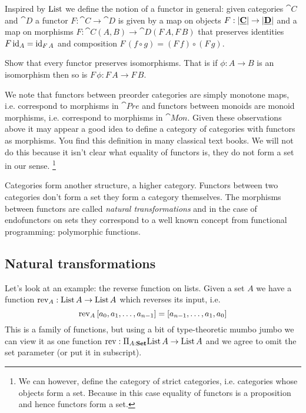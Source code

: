 Inspired by $\mathrm{List}$ we define the notion of a functor in general: given categories $\cat{C}$ and $\cat{D}$ a functor $F : \cat{C} \to \cat{D}$ is given by a map on objects $F : |\underline{\mathbf{C}}| \to |\underline{\mathbf{D}}|$ and a map on morphisms 
$F : \cat{C}(A,B) \to \cat{D}(F\,A,F\,B)$ that preserves identities $F\,\mathrm{id}_A = \mathrm{id}_{F\,A}$ and composition $F\,(f \circ g) = (F\,f) \circ (F\,g)$.

\begin{Exercise}
  Show that every functor preserves isomorphisms. That is if $\phi : A \to B$ is an isomorphism then so is $F\,\phi : F\,A \to F\,B$.
\end{Exercise}

We note that functors between preorder categories are simply monotone maps, i.e. correspond to morphisms in $\cat{Pre}$ and functors between monoids are monoid morphisms, i.e. correspond to morphisms in $\cat{Mon}$. Given these observations above it may appear a good idea to define a category of categories with functors as morphisms. You find this definition in many classical text books. We will not do this because it isn't clear what equality of functors is, they do not form a set in our sense.
\footnote{We can however, define the category of strict categories, i.e. categories whose objects form a set. Because in this case equality of functors is a proposition and hence functors form a set.}

Categories form another structure, a higher category. Functors between two categories don't form a set they form a category themselves.
The morphisms between functors are called \emph{natural transformations} and in the case of endofunctors on sets they correspond to a well known concept from functional programming: polymorphic functions. 

\subsection{Natural transformations}
\label{sec:natfns}

Let's look at an example: the reverse function on lists. Given a set $A$ we have a function $\mathrm{rev}_A : \mathrm{List}\,A \to \mathrm{List}\,A$ which reverses its input, i.e. 
\[\mathrm{rev}_A\, [a_0,a_1,\dots,a_{n-1}] = [a_{n-1},\dots,a_1,a_0]\]
This is a family of functions, but using a bit of type-theoretic mumbo jumbo we can view it as one function $\mathrm{rev} : \Pi_{A:\mathbf{Set}} \mathrm{List}\,A \to \mathrm{List}\,A$ and we agree to omit the set parameter (or put it in subscript). 

